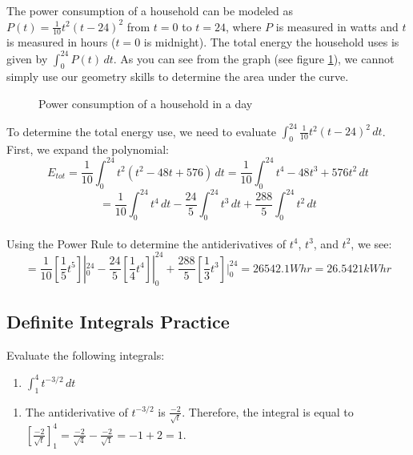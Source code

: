 The power consumption of a household can be modeled as 
$P(t) = \frac{1}{10} t^2 (t - 24)^2$ from $t = 0$ to $t = 24$, where 
$P$ is measured in watts and $t$ is measured in hours ($t = 0$ is 
midnight). The total energy the household uses is given by $\int_{0}^{24} 
P(t)\,dt$. As you can see from the graph (see figure \ref{fig:power}), 
we cannot simply use our geometry skills to determine the area under 
the curve. 

\begin{figure}
	\caption{Power consumption of a household in a day}
	\label{fig:power}
\end{figure}

To determine the total energy use, we need to evaluate $\int_{0}^{24} 
\frac{1}{10}t^2(t-24)^2\,dt$. First, we expand the polynomial:\\
$$E_{tot} = \frac{1}{10} \int_{0}^{24} t^2 (t^2-48t+576)\,dt = 
\frac{1}{10}\int_{0}^{24} t^4 - 48t^3 + 576t^2\,dt$$
$$= \frac{1}{10}\int_{0}^{24} t^4\,dt - \frac{24}{5}\int_{0}^{24} 
t^3\,dt + \frac{288}{5}\int_{0}^{24} t^2\,dt$$\\
Using the Power Rule to determine the antiderivatives of $t^4$, $t^3$, 
and $t^2$, we see:\\
$$=\frac{1}{10}[\frac{1}{5}t^5]|_{0}^{24} - \frac{24}{5}
[\frac{1}{4}t^4]|_{0}^{24} + \frac{288}{5}[\frac{1}{3}t^3]|_{0}^{24} 
= 26542.1 Whr = 26.5421 kWhr$$

\subsection{Definite Integrals Practice}
\begin{Exercise}[label=FTC2]
	Evaluate the following integrals:
	\begin{enumerate}
	\item $\int_1^4 t^{-3/2}\,dt$
	\end{enumerate}
\end{Exercise}

\begin{Answer}[ref=FTC2]
	\begin{enumerate}
	\item The antiderivative of $t^{-3/2}$ is $\frac{-2}{\sqrt{t}}$. 
	Therefore, the integral is equal to $[\frac{-2}{\sqrt{t}}]_1^4 = 
	\frac{-2}{\sqrt{4}} - \frac{-2}{\sqrt{1}} = -1 + 2 = 1$. 
	\end{enumerate}
\end{Answer}

